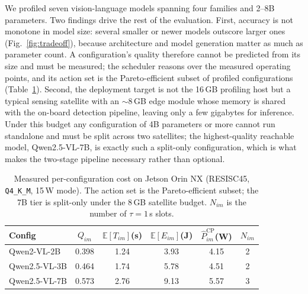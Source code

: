 We profiled seven vision-language models spanning four families and 2--8B parameters. Two
findings drive the rest of the evaluation. First, accuracy is not monotone in model size:
several smaller or newer models outscore larger ones (Fig.~\ref{fig:tradeoff}), because
architecture and model generation matter as much as parameter count. A configuration's quality
therefore cannot be predicted from its size and must be measured; the scheduler reasons over the
measured operating points, and its action set is the Pareto-efficient subset of profiled
configurations (Table~\ref{tab_calib}). Second, the deployment target is not the 16\,GB profiling
host but a typical sensing satellite with an $\sim$8\,GB edge module whose memory is shared with
the on-board detection pipeline, leaving only a few gigabytes for inference. Under this budget any
configuration of 4B parameters or more cannot run standalone and must be split across two
satellites; the highest-quality reachable model, Qwen2.5-VL-7B, is exactly such a split-only
configuration, which is what makes the two-stage pipeline necessary rather than optional.

\begin{table}[!t]
\centering\small
\caption{\label{tab_calib}Measured per-configuration cost on Jetson Orin NX (RESISC45,
\texttt{Q4\_K\_M}, 15\,W mode). The action set is the Pareto-efficient subset; the 7B tier is
split-only under the 8\,GB satellite budget. $N_{im}$ is the number of $\tau{=}1$\,s slots.}
\begin{tabular}{lccccc}
\toprule
Config & $Q_{im}$ & $\mathbb{E}[T_{im}]$(s) & $\mathbb{E}[E_{im}]$(J) & $\hat{P}_{im}^{\text{CP}}$(W) & $N_{im}$ \\
\midrule
Qwen2-VL-2B   & 0.398 & 1.24 & 3.93 & 4.15 & 2 \\
Qwen2.5-VL-3B & 0.464 & 1.74 & 5.78 & 4.51 & 2 \\
Qwen2.5-VL-7B & 0.573 & 2.76 & 9.13 & 5.57 & 3 \\
\bottomrule
\end{tabular}
\end{table}

